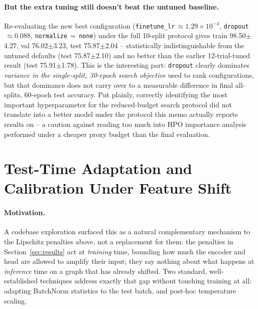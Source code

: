 \documentclass{article}
\newcommand{\score}[2]{#1{\scriptsize$\pm$#2}}
\begin{document}
\paragraph{But the extra tuning still doesn't beat the untuned baseline.}
Re-evaluating the new best configuration
(\texttt{finetune\_lr}$\,\approx 1.29\times10^{-4}$,
\texttt{dropout}$\,\approx 0.088$, \texttt{normalize}$\,=\,$\texttt{none})
under the full 10-split protocol gives train \score{98.50}{4.27}, val
\score{76.02}{3.23}, test \score{75.87}{2.04} -- statistically
indistinguishable from the untuned defaults (test \score{75.87}{2.10}) and
no better than the earlier 12-trial-tuned result (test \score{75.91}{1.78}).
This is the interesting part: \texttt{dropout} clearly dominates
\emph{variance in the single-split, 30-epoch search objective} used to
rank configurations, but that dominance does not carry over to a
measurable difference in final all-splits, 60-epoch test accuracy. Put
plainly, correctly identifying the most important hyperparameter for the
reduced-budget search protocol did not translate into a better model
under the protocol this memo actually reports results on -- a caution
against reading too much into HPO importance analysis performed under a
cheaper proxy budget than the final evaluation.

\section{Test-Time Adaptation and Calibration Under Feature Shift}
\label{sec:tta}

\paragraph{Motivation.} A codebase exploration surfaced this as a natural
complementary mechanism to the Lipschitz penalties above, not a
replacement for them: the penalties in Section~\ref{sec:results} act at
\emph{training} time, bounding how much the encoder and head are allowed
to amplify their input; they say nothing about what happens at
\emph{inference} time on a graph that has already shifted. Two standard,
well-established techniques address exactly that gap without touching
training at all: adapting BatchNorm statistics to the test batch, and
post-hoc temperature scaling.
\end{document}
